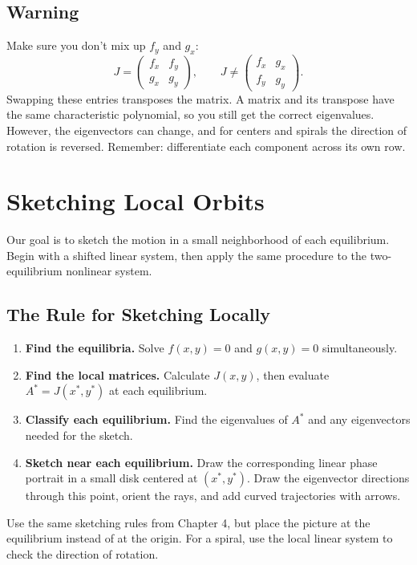 \documentclass[10pt,letterpaper]{article}
\begin{document}
\subsection{Warning}
Make sure you don't mix up $f_y$ and $g_x$:
$$
    J = \begin{pmatrix}
        f_x & f_y\\
        g_x & g_y
    \end{pmatrix}, \qquad 
    J \ne \begin{pmatrix}
        f_x & g_x\\
        f_y & g_y
    \end{pmatrix}.
$$
Swapping these entries transposes the matrix. A matrix and its transpose have the same characteristic polynomial, so you still get the correct eigenvalues. However, the eigenvectors can change, and for centers and spirals the direction of rotation is reversed. Remember: differentiate each component across its own row. 



\section{Sketching Local Orbits}

Our goal is to sketch the motion in a small neighborhood of each equilibrium. Begin with a shifted linear system, then apply the same procedure to the two-equilibrium nonlinear system.

\subsection{The Rule for Sketching Locally}
\begin{enumerate}
    \item \textbf{Find the equilibria.} Solve $f(x,y)=0$ and $g(x,y)=0$ simultaneously.
    \item \textbf{Find the local matrices.} Calculate $J(x,y)$, then evaluate $A^*=J(x^*,y^*)$ at each equilibrium.
    \item \textbf{Classify each equilibrium.} Find the eigenvalues of $A^*$ and any eigenvectors needed for the sketch.
    \item \textbf{Sketch near each equilibrium.} Draw the corresponding linear phase portrait in a small disk centered at $(x^*,y^*)$. Draw the eigenvector directions through this point, orient the rays, and add curved trajectories with arrows.
\end{enumerate}
Use the same sketching rules from Chapter 4, but place the picture at the equilibrium instead of at the origin. For a spiral, use the local linear system to check the direction of rotation.
\end{document}
